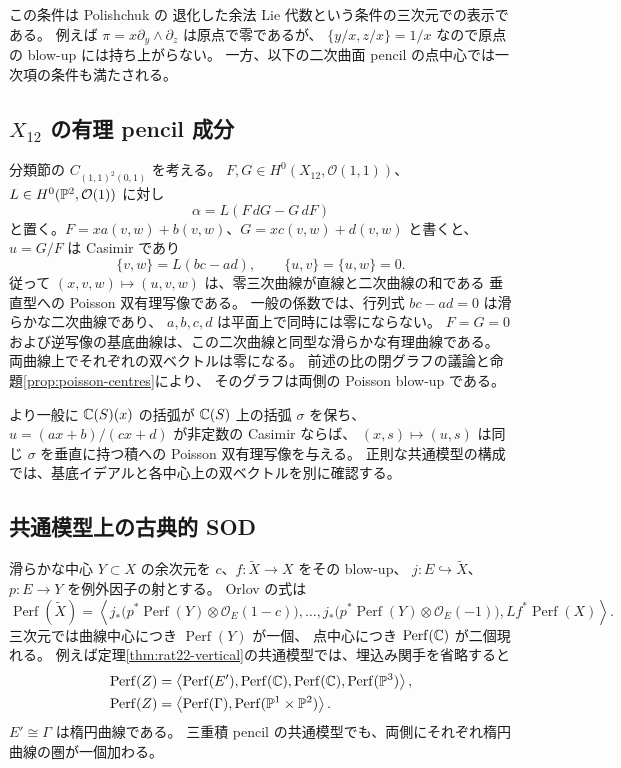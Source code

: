 この条件は Polishchuk \cite[定理8.2、命題8.3]{Polishchuk1997} の
退化した余法 Lie 代数という条件の三次元での表示である。
例えば $\pi=x\partial_y\wedge\partial_z$ は原点で零であるが、
$\{y/x,z/x\}=1/x$ なので原点の blow-up には持ち上がらない。
一方、以下の二次曲面 pencil の点中心では一次項の条件も満たされる。





\subsection{\texorpdfstring{$X_{12}$}{X12} の有理 pencil 成分}
分類節の $C_{(1,1)^2(0,1)}$ を考える。
$F,G\in H^0(X_{12},\mathcal O(1,1))$、
$L\in H^0(\mathbb P^2,\mathcal O(1))$ に対し
\[
 \alpha=L(F\,dG-G\,dF)
\]
と置く。$F=xa(v,w)+b(v,w)$、$G=xc(v,w)+d(v,w)$ と書くと、
$u=G/F$ は Casimir であり
\[
 \{v,w\}=L(bc-ad),\qquad \{u,v\}=\{u,w\}=0.
\]
従って $(x,v,w)\mapsto(u,v,w)$ は、零三次曲線が直線と二次曲線の和である
垂直型への Poisson 双有理写像である。
一般の係数では、行列式 $bc-ad=0$ は滑らかな二次曲線であり、
$a,b,c,d$ は平面上で同時には零にならない。
$F=G=0$ および逆写像の基底曲線は、この二次曲線と同型な滑らかな有理曲線である。
両曲線上でそれぞれの双ベクトルは零になる。
前述の比の閉グラフの議論と命題\ref{prop:poisson-centres}により、
そのグラフは両側の Poisson blow-up である。

より一般に $\mathbb C(S)(x)$ の括弧が $\mathbb C(S)$ 上の括弧 $\sigma$ を保ち、
$u=(ax+b)/(cx+d)$ が非定数の Casimir ならば、
$(x,s)\mapsto(u,s)$ は同じ $\sigma$ を垂直に持つ積への Poisson 双有理写像を与える。
正則な共通模型の構成では、基底イデアルと各中心上の双ベクトルを別に確認する。

\subsection{共通模型上の古典的 SOD}

滑らかな中心 $Y\subset X$ の余次元を $c$、$f:\widetilde X\to X$ をその blow-up、
$j:E\hookrightarrow\widetilde X$、$p:E\to Y$ を例外因子の射とする。
Orlov \cite[定理4.3]{OrlovBlowup} の式は
\[
 \operatorname{Perf}(\widetilde X)=
 \left\langle
 j_*\bigl(p^*\operatorname{Perf}(Y)\otimes\mathcal O_E(1-c)\bigr),\ldots,
 j_*\bigl(p^*\operatorname{Perf}(Y)\otimes\mathcal O_E(-1)\bigr),
 Lf^*\operatorname{Perf}(X)
 \right\rangle.
\]
三次元では曲線中心につき $\operatorname{Perf}(Y)$ が一個、
点中心につき $\operatorname{Perf}(\mathbb C)$ が二個現れる。
例えば定理\ref{thm:rat22-vertical}の共通模型では、埋込み関手を省略すると
\[
\begin{aligned}
 \operatorname{Perf}(Z)
 &=\left\langle\operatorname{Perf}(E'),\operatorname{Perf}(\mathbb C),
                  \operatorname{Perf}(\mathbb C),\operatorname{Perf}(\mathbb P^3)\right\rangle,\\
 \operatorname{Perf}(Z)
 &=\left\langle\operatorname{Perf}(\Gamma),
                  \operatorname{Perf}(\mathbb P^1\times\mathbb P^2)\right\rangle.
\end{aligned}
\]
$E'\cong\Gamma$ は楕円曲線である。
三重積 pencil の共通模型でも、両側にそれぞれ楕円曲線の圏が一個加わる。

